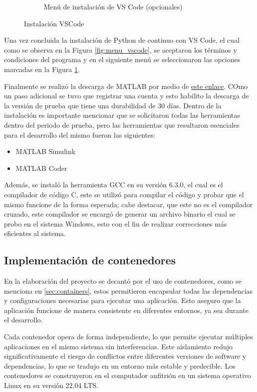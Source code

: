\begin{figure}[htbp]
\begin{subfigure}[b]{0.45\textwidth}
        \caption{Menú de instalación de VS Code (opcionales)}
        \label{fig:menu_vscode_adicionales}
    \end{subfigure}
    \caption{Instalación VSCode}
    \label{fig:menu_vscode_2}
\end{figure}


Una vez concluida la instalación de Python de continuo con VS Code, el cual como se observa en la Figura \ref{fig:menu_vscode}, se aceptaron los términos y condiciones del programa y en el siguiente menú se seleccionaron las opciones marcadas en la Figura \ref{fig:menu_vscode_adicionales}.

Finalmente se realizó la descarga de MATLAB  por medio de \href{https://matlab.mathworks.com/}{este enlace}. COmo un paso adicional se tuvo que registrar una cuenta y esto habilito la descarga de la versión de prueba que tiene una durabilidad de 30 días. Dentro de la instalación es importante mencionar que se solicitaron todas las herramientas dentro del periodo de prueba, pero las herramientas que resultaron esenciales para el desarrollo del mismo fueron las siguientes:

\begin{itemize}
    \item MATLAB Simulink
    \item MATLAB Coder
\end{itemize}

Además, se instaló la herramienta GCC en su versión 6.3.0, el cual es el compilador de código C, este se utilizó para compilar el código y probar que el mismo funcione de la forma esperada; cabe destacar, que este no es el compilador cruzado, este compilador se encargó de generar un archivo binario el cual se probo en el sistema Windows, esto con el fin de realizar correcciones más eficientes al sistema.

\subsection{Implementación de contenedores}\label{sec:entorno_en_contenedores}

En la elaboración del proyecto se decantó por el uso de contenedores, como se menciona en \ref{sec:containers}, estos permitieron encapsular todas las dependencias y configuraciones necesarias para ejecutar una aplicación. Esto aseguro que la aplicación funcione de manera consistente en diferentes entornos, ya sea durante el desarrollo. 

Cada contenedor opera de forma independiente, lo que permite ejecutar múltiples aplicaciones en el mismo sistema sin interferencias. Este aislamiento redujo significativamente el riesgo de conflictos entre diferentes versiones de software y dependencias, lo que se tradujo en un entorno más estable y predecible. Los contenedores se construyeron en el computador anfitrión en un sistema operativo Linux en su versión 22.04 LTS.

